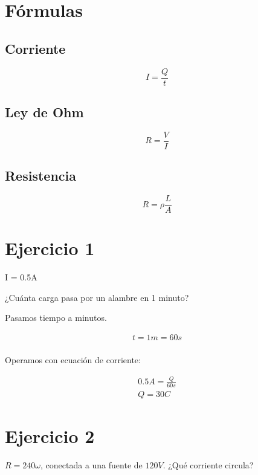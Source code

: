 \section{Fórmulas}

\subsection{Corriente}

\begin{equation}
    I = \frac{Q}{t}
\end{equation}

\subsection{Ley de Ohm}

\begin{equation}
    R = \frac{V}{I}
\end{equation}

\subsection{Resistencia}

\begin{equation}
    R = \rho\frac{L}{A}
\end{equation}

\section{Ejercicio 1}

I = 0.5A

¿Cuánta carga pasa por un alambre en 1 minuto?

Pasamos tiempo a minutos.

\begin{align*}
    t = 1 m = 60 s \\
\end{align*}

Operamos con ecuación de corriente:

\begin{align*}
    0.5A = \frac{Q}{60 s} \\
    \boxed{Q = 30 C}
\end{align*}

\section{Ejercicio 2}

\(R = 240 \omega\), conectada a una fuente de \(120 V\).
¿Qué corriente circula?

